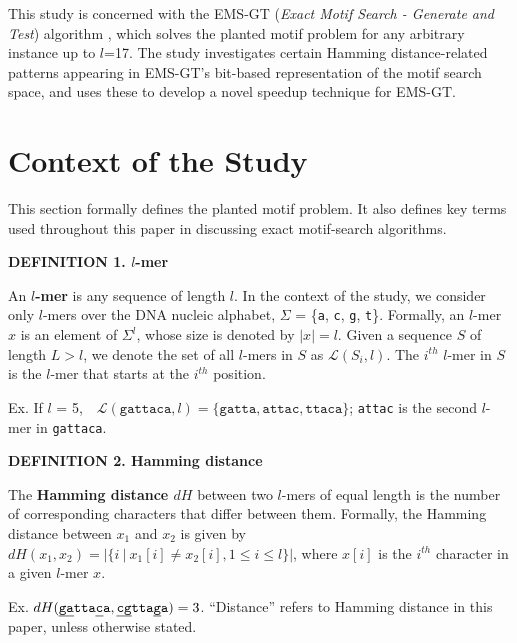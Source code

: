 \documentclass[oneside,12pt]{DISCSthesis}
\begin{document}
		This study is concerned with the EMS-GT (\emph{Exact Motif Search - Generate and Test}) algorithm \cite{nabos2015dissertation}, which solves the planted motif problem for any arbitrary instance up to $l$=17. The study investigates certain Hamming distance-related patterns appearing in EMS-GT's bit-based representation of the motif search space, and uses these to develop a novel speedup technique for EMS-GT.

	\newpage
	\section{Context of the Study}
		This section formally defines the planted motif problem. It also defines key terms used throughout this paper in discussing exact motif-search algorithms.\vspace{5mm}

		\noindent\textbf{\boldmath DEFINITION 1. $l$-mer}

		\noindent An \textbf{\boldmath $l$-mer} is any sequence of length $l$. In the context of the study, we consider only $l$-mers over the DNA nucleic alphabet, $\Sigma$ = \{\texttt{a}, \texttt{c}, \texttt{g}, \texttt{t}\}. Formally, an $l$-mer $x$ is an element of $\Sigma^l$, whose size is denoted by $|x| = l$. Given a sequence $S$ of length $L > l$, we denote the set of all $l$-mers in $S$ as $\mathcal{L}(S_i, l)$. The $i^{th}$ $l$-mer in $S$ is the $l$-mer that starts at the $i^{th}$ position.

		\noindent \hspace*{35pt} Ex. If $l$ = 5,\ \ $\mathcal{L}(\texttt{gattaca}, l)= \{\texttt{gatta},\texttt{attac},\texttt{ttaca}\}$;
		\newline\hspace*{55pt}	\texttt{attac} is the second $l$-mer in \texttt{gattaca}.\newline

		\noindent\textbf{\boldmath DEFINITION 2. Hamming distance}

		\noindent The \textbf{\boldmath Hamming distance $dH$} between two $l$-mers of equal length is the number of corresponding characters that differ between them. Formally, the Hamming distance between $x_1$ and $x_2$ is given by $ dH(x_1, x_2) = | \{i\ |\ x_1[i] \neq x_2[i], 1 \leq i \leq l\} |$, where $x[i]$ is the $i^{th}$ character in a given $l$-mer $x$.

		\noindent \hspace*{35pt} Ex. $dH(\texttt{\ul{ga}tta\ul{c}a}, \texttt{\ul{cg}tta\ul{g}a}) = 3$. \newline
		\noindent ``Distance'' refers to Hamming distance in this paper, unless otherwise stated.\newline
\end{document}
